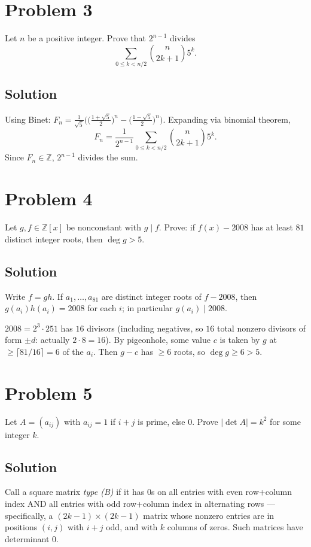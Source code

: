 \documentclass{article}
\begin{document}
\section*{Problem 3}
Let $n$ be a positive integer. Prove that $2^{n-1}$ divides
\[
\sum_{0 \le k < n/2} \binom{n}{2k+1} 5^k.
\]

\subsection*{Solution}
Using Binet: $F_n = \tfrac{1}{\sqrt 5}\bigl(\bigl(\tfrac{1+\sqrt 5}{2}\bigr)^n - \bigl(\tfrac{1-\sqrt 5}{2}\bigr)^n\bigr)$. Expanding via binomial theorem,
\[
F_n = \frac{1}{2^{n-1}} \sum_{0 \le k < n/2} \binom{n}{2k+1} 5^k.
\]
Since $F_n \in \mathbb{Z}$, $2^{n-1}$ divides the sum.

\section*{Problem 4}
Let $g, f \in \mathbb{Z}[x]$ be nonconstant with $g \mid f$. Prove: if $f(x) - 2008$ has at least $81$ distinct integer roots, then $\deg g > 5$.

\subsection*{Solution}
Write $f = gh$. If $a_1, \ldots, a_{81}$ are distinct integer roots of $f - 2008$, then $g(a_i) h(a_i) = 2008$ for each $i$; in particular $g(a_i) \mid 2008$.

$2008 = 2^3 \cdot 251$ has $16$ divisors (including negatives, so $16$ total nonzero divisors of form $\pm d$: actually $2 \cdot 8 = 16$). By pigeonhole, some value $c$ is taken by $g$ at $\ge \lceil 81/16 \rceil = 6$ of the $a_i$. Then $g - c$ has $\ge 6$ roots, so $\deg g \ge 6 > 5$.

\section*{Problem 5}
Let $A = (a_{ij})$ with $a_{ij} = 1$ if $i + j$ is prime, else $0$. Prove $|\det A| = k^2$ for some integer $k$.

\subsection*{Solution}
Call a square matrix \emph{type (B)} if it has $0$s on all entries with even row+column index AND all entries with odd row+column index in alternating rows --- specifically, a $(2k-1) \times (2k-1)$ matrix whose nonzero entries are in positions $(i, j)$ with $i + j$ odd, and with $k$ columns of zeros. Such matrices have determinant $0$.
\end{document}
